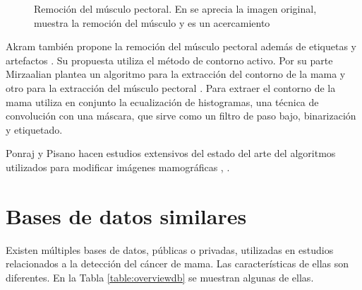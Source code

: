 \begin{figure}[h]
    \centering
    \hspace{1cm}
    \hspace{1cm}
  \caption[Remoción del músculo pectoral]
  {Remoción del músculo pectoral. En \protect{} se aprecia la 
  imagen original, \protect{} muestra la remoción del músculo y 
  \protect{} es un acercamiento}
  \label{fig:muscle}
\end{figure}

Akram también propone la remoción del músculo pectoral además de etiquetas y
artefactos \cite{akram2013preprocessing}. Su propuesta utiliza el método de
contorno activo. Por su parte Mirzaalian plantea un algoritmo para la
extracción del contorno de la mama y otro para la extracción del músculo
pectoral \cite{mirzaalian2007pre}. Para extraer el contorno de la mama utiliza
en conjunto la ecualización de histogramas, una técnica de convolución con una
máscara, que sirve como un filtro de paso bajo, binarización y etiquetado.


Ponraj y Pisano hacen estudios extensivos del estado del arte del algoritmos
utilizados para modificar imágenes mamográficas \cite{ponraj2011survey},
\cite{pisano2000image}.

\section{Bases de datos similares}

Existen múltiples bases de datos, públicas o privadas, utilizadas en estudios
relacionados a la detección del cáncer de mama. Las características de ellas
son diferentes. En la Tabla \ref{table:overviewdb} se muestran algunas de ellas.

